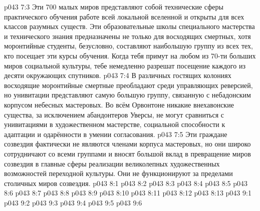 \vs p043 7:3 Эти 700 малых миров представляют собой технические сферы практического обучения работе всей локальной вселенной и открыты для всех классов разумных существ. Эти образовательные школы специального мастерства и технического знания предназначены не только для восходящих смертных, хотя моронтийные студенты, безусловно, составляют наибольшую группу из всех тех, кто посещает эти курсы обучения. Когда тебя примут на любом из 70-ти больших миров социальной культуры, тебе немедленно разрешат посещение каждого из десяти окружающих спутников.
\vs p043 7:4 В различных гостящих колониях восходящие моронтийные смертные преобладают среди управляющих реверсией, но унивитации представляют самую большую группу, связанную с небадонским корпусом небесных мастеровых. Во всём Орвонтоне никакие внехавонские существа, за исключением абандонтеров Уверсы, не могут сравниться с унивитациями в художественном мастерстве, социальной способности к адаптации и одарённости в умении согласования.
\vs p043 7:5 Эти граждане созвездия фактически не являются членами корпуса мастеровых, но они широко сотрудничают со всеми группами и вносят большой вклад в превращение миров созвездия в главные сферы реализации великолепных художественных возможностей переходной культуры. Они не функционируют за пределами столичных миров созвездия.
\vs p043 8:1 
\vs p043 8:2 
\vs p043 8:3 
\vs p043 8:4 
\vs p043 8:5 
\vs p043 8:6 
\vs p043 8:7 
\vs p043 8:8 
\vs p043 8:9 
\vs p043 8:10 
\vs p043 8:11 
\vs p043 8:12 \pc 
\vs p043 8:13 
\vs p043 9:1 
\vs p043 9:2 \pc 
\vs p043 9:3 
\vs p043 9:4 \pc 
\vs p043 9:5 
\vsetoff
\vs p043 9:6 
\quizlink

